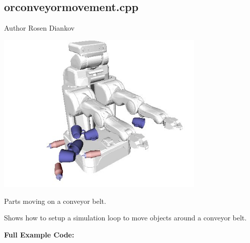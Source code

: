 \hypertarget{orconveyormovement.cpp-example}{
\subsection{orconveyormovement.cpp}
}
\begin{DoxyAuthor}{Author}
Rosen Diankov
\end{DoxyAuthor}
 
\begin{DoxyImage}
\includegraphics[width=10cm]{cppexample_orconveyormovement.jpg}
\caption{Parts moving on a conveyor belt.}
\end{DoxyImage}


Shows how to setup a simulation loop to move objects around a conveyor belt.

{\bfseries Full Example Code:}


